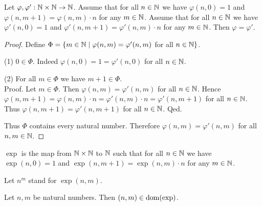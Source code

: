 \documentclass[../arithmetic.tex]{subfiles}
\begin{document}
  \begin{forthel}
    \begin{lemma}
      Let $\varphi, \varphi' : \mathbb{N} \times \mathbb{N} \to \mathbb{N}$.
      Assume that for all $n \in \mathbb{N}$ we have $\varphi(n, 0) = 1$ and
      $\varphi(n, m + 1) = \varphi(n,m) \cdot n$ for any $m \in \mathbb{N}$.
      Assume that for all $n \in \mathbb{N}$ we have $\varphi'(n, 0) = 1$ and
      $\varphi'(n, m + 1) = \varphi'(n,m) \cdot n$ for any $m \in \mathbb{N}$.
      Then $\varphi = \varphi'$.
    \end{lemma}
    \begin{proof}
      Define $\Phi = \{ m \in \mathbb{N} \mid \varphi(n,m) = \varphi'(n,m)$ for
      all $n \in \mathbb{N} \}$.

      (1) $0 \in \Phi$.
      Indeed $\varphi(n,0) = 1 = \varphi'(n,0)$ for all $n \in \mathbb{N}$.

      (2) For all $m \in \Phi$ we have $m + 1 \in \Phi$. \\
      Proof.
        Let $m \in \Phi$.
        Then $\varphi(n,m) = \varphi'(n,m)$ for all $n \in \mathbb{N}$.
        Hence $\varphi(n, m + 1)
          = \varphi(n,m) \cdot n
          = \varphi'(n,m) \cdot n
          = \varphi'(n, m + 1)$
        for all $n \in \mathbb{N}$.
        Thus $\varphi(n,m + 1) = \varphi'(n,m + 1)$ for all $n \in \mathbb{N}$.
      Qed.

      Thus $\Phi$ contains every natural number.
      Therefore $\varphi(n,m) = \varphi'(n,m)$ for all $n, m \in \mathbb{N}$.
    \end{proof}
  \end{forthel}

  \begin{forthel}
    \begin{definition}
      $\exp$ is the map from $\mathbb{N} \times \mathbb{N}$ to $\mathbb{N}$ such that for all
      $n \in \mathbb{N}$ we have $\exp(n, 0) = 1$ and $\exp(n, m + 1) =
      \exp(n, m) \cdot n$ for any $m \in \mathbb{N}$.
    \end{definition}

    Let $n^{m}$ stand for $\exp(n,m)$.
  \end{forthel}

  \begin{forthel}
    \begin{lemma}
      Let $n, m$ be natural numbers.
      Then $(n,m) \in \operatorname{dom}(\operatorname{exp})$.
    \end{lemma}
  \end{forthel}
\end{document}
